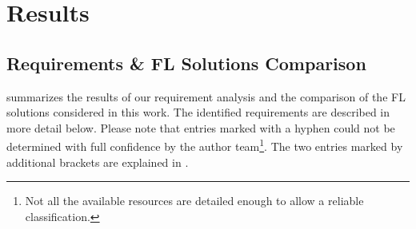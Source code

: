 \section{Results}
\label{sec:Results}

\subsection{Requirements \& FL Solutions Comparison}
\label{subsec:ResultsRequirements}

 summarizes the results of our requirement analysis and the comparison of the FL solutions considered in this work. The identified requirements are described in more detail below. Please note that entries marked with a hyphen could not be determined with full confidence by the author team\footnote{Not all the available resources are detailed enough to allow a reliable classification.}.
The two entries marked by additional brackets are explained in .

